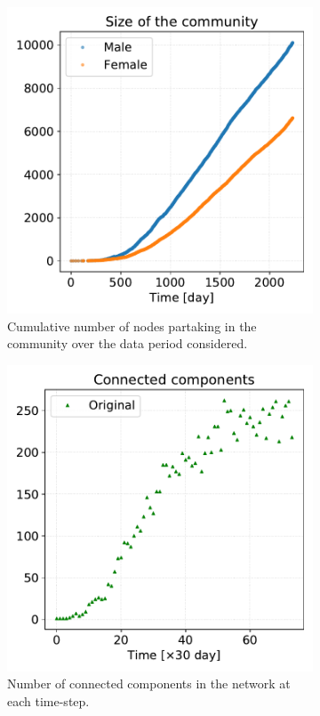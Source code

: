 \documentclass[a4paper,11pt, twocolumn]{article}
\begin{document}
\begin{figure}[H]
\begin{subfigure}[t]{0.24\textwidth}
\centering
\includegraphics[scale=0.30]{./Figure/Static/Size_community.pdf}
\caption{Cumulative number of nodes partaking in the community over the data period considered.}
\label{growth}
\end{subfigure}
\begin{subfigure}[t]{0.24\textwidth}
 \centering
\includegraphics[scale=0.30]{./Figure/Temporal/connected_components_original.pdf}
\caption{Number of connected components in the network at each time-step.}
\end{subfigure}
\caption{}
\end{figure}
\end{document}
